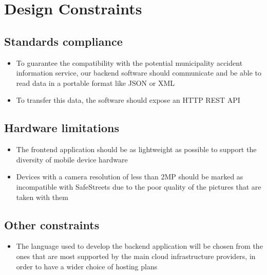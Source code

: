 \section{Design Constraints}

\subsection{Standards compliance}
  \begin{itemize}
    \item To guarantee the compatibility with the potential municipality accident information service, our backend software should communicate and be able to read data in a portable format like JSON or XML
    \item To transfer this data, the software should expose an HTTP REST API
  \end{itemize}

\subsection{Hardware limitations}
  \begin{itemize}
    \item The frontend application should be as lightweight as possible to support the diversity of mobile device hardware
    \item Devices with a camera resolution of less than 2MP should be marked as incompatible with SafeStreets due to the poor quality of the pictures that are taken with them
  \end{itemize}

\subsection{Other constraints}
  \begin{itemize}
    \item The language used to develop the backend application will be chosen from the ones that are most supported by the main cloud infrastructure providers, in order to have a wider choice of hosting plans
  \end{itemize}